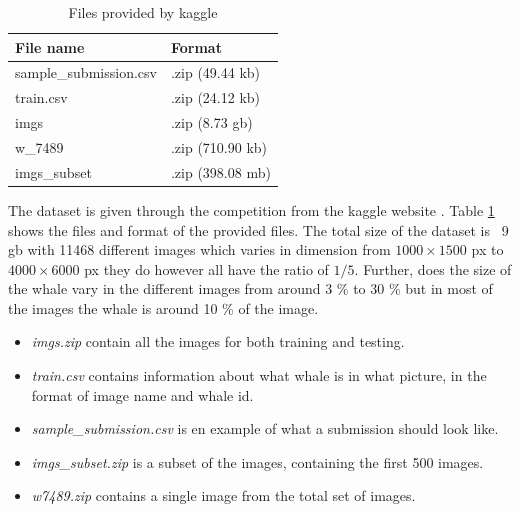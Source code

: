 \begin{table}
	\centering
	\caption{Files provided by kaggle}
	\label{table:dataset-files}
	\begin{tabular}{|l|l|}
		\hline
		File name              & Format           \\ \hline \hline
		sample\_submission.csv & .zip (49.44 kb)  \\ \hline
		train.csv              & .zip (24.12 kb)  \\ \hline
		imgs                   & .zip (8.73 gb)   \\ \hline
		w\_7489                & .zip (710.90 kb) \\ \hline
		imgs\_subset           & .zip (398.08 mb) \\ \hline
	\end{tabular}
\end{table}

The dataset is given through the competition from the kaggle website \cite{kaggle:competition}. Table \ref{table:dataset-files} shows the files and format of the provided files. The total size of the dataset is ~9 gb with 11468 different images which varies in dimension from \(1000 \times 1500\) px to \(4000 \times 6000\) px they do however all have the ratio of \(1/5\).
Further, does the size of the whale vary in the different images from around 3 \% to 30 \% but in most of the images the whale is around 10 \% of the image.

\begin{itemize}
	\item \emph{imgs.zip} contain all the images for both training and testing.
	\item \emph{train.csv} contains information about what whale is in what picture, in the format of image name and whale id.
	\item \emph{sample\_submission.csv} is en example of what a submission should look like.
	\item \emph{imgs\_subset.zip} is a subset of the images, containing the first 500 images.
	\item \emph{w\-7489.zip} contains a single image from the total set of images.
\end{itemize}

